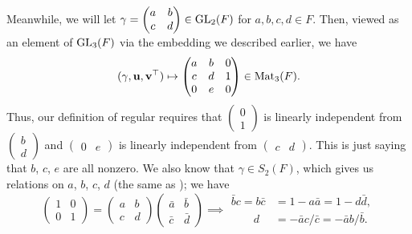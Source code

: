 Meanwhile, we will let
$\gamma = \begin{pmatrix} a & b \\ c & d \end{pmatrix} \in \operatorname{GL}_2(F)$
for $a,b,c,d \in F$.
Then, viewed as an element of $\operatorname{GL}_3(F)$ via the embedding we described earlier, we have
\[
  (\gamma, \mathbf u, \mathbf v^\top)
  \mapsto \begin{pmatrix}
    a & b & 0 \\
    c & d & 1 \\
    0 & e & 0
  \end{pmatrix} \in \operatorname{Mat}_3(F).
\]
Thus, our definition of regular requires that
$\begin{pmatrix} 0 \\ 1 \end{pmatrix}$
is linearly independent from $\begin{pmatrix} b \\ d \end{pmatrix}$
and
$\begin{pmatrix} 0 & e \end{pmatrix}$
is linearly independent from $\begin{pmatrix} c & d \end{pmatrix}$.
This is just saying that $b$, $c$, $e$ are all nonzero.
We also know that $\gamma \in S_2(F)$, which gives us relations on $a$, $b$, $c$, $d$
(the same as \cite[Equation (7.3.2)]{ref:AFLspherical}); we have
\[
  \begin{pmatrix} 1 & 0 \\ 0 & 1 \end{pmatrix}
  = \begin{pmatrix} a & b \\ c & d \end{pmatrix} \begin{pmatrix} \bar a & \bar b \\ \bar c & \bar d \end{pmatrix}
  \implies
  \begin{aligned}
    \bar b c = b \bar c &= 1 - a \bar a = 1 - d \bar d, \\
    \qquad d &= - \bar a c / \bar c = -\bar a b / \bar b.
  \end{aligned}
\]

